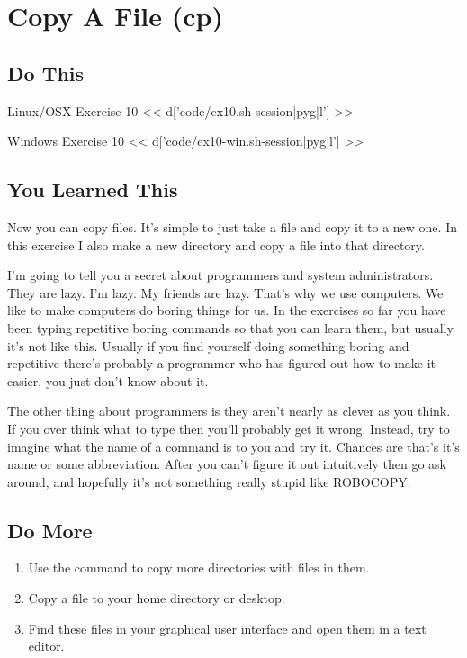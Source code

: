 \chapter{Copy A File (cp)}

\section{Do This}

\begin{code}{Linux/OSX Exercise 10}
<< d['code/ex10.sh-session|pyg|l'] >>
\end{code}

\begin{code}{Windows Exercise 10}
<< d['code/ex10-win.sh-session|pyg|l'] >>
\end{code}

\section{You Learned This}

Now you can copy files.  It's simple to just take a file and copy it to a new
one.  In this exercise I also make a new directory and copy a file into that
directory.

I'm going to tell you a secret about programmers and system administrators.
They are lazy.  I'm lazy.  My friends are lazy.  That's why we use computers.
We like to make computers do boring things for us.  In the exercises so far
you have been typing repetitive boring commands so that you can learn them,
but usually it's not like this.  Usually if you find yourself doing something
boring and repetitive there's probably a programmer who has figured out
how to make it easier, you just don't know about it.

The other thing about programmers is they aren't nearly as clever as you
think.  If you over think what to type then you'll probably get it wrong.
Instead, try to imagine what the name of a command is to you and try it.
Chances are that's it's name or some abbreviation.  After you can't figure
it out intuitively then go ask around, and hopefully it's not something
really stupid like ROBOCOPY.


\section{Do More}

\begin{enumerate}
\item Use the  command to copy more directories with files in them.
\item Copy a file to your home directory or desktop.
\item Find these files in your graphical user interface and open them
    in a text editor.
\end{enumerate}

